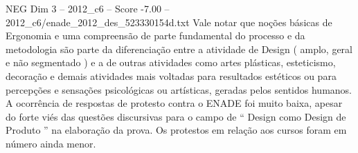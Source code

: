 \begin{textsample}{NEG Dim 3 – 2012\_c6 – Score -7.00 – 2012\_c6/enade\_2012\_des\_523330154d.txt}
Vale notar que noções básicas de Ergonomia e uma compreensão de parte fundamental do processo e da metodologia são parte da diferenciação entre a atividade de Design ( amplo, geral e não segmentado ) e a de outras atividades como artes plásticas, esteticismo, decoração e demais atividades mais voltadas para resultados estéticos ou para percepções e sensações psicológicas ou artísticas, geradas pelos sentidos humanos.
A ocorrência de respostas de protesto contra o ENADE foi muito baixa, apesar do forte viés das questões discursivas para o campo de “ Design como Design de Produto ” na elaboração da prova.
Os protestos em relação aos cursos foram em número ainda menor.

\end{textsample}

